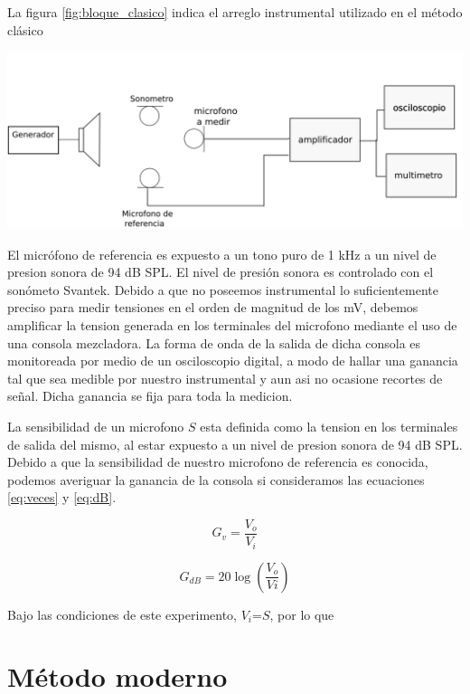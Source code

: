 \documentclass[]{article}
\makeatletter
\newenvironment{figurehere}   %
  {\def\@captype{figure}}   %
  {\par\medskip}
  {}              %
\makeatother
\begin{document}
\begin{multicols}{2}
La figura \ref{fig:bloque_clasico} indica el arreglo instrumental utilizado en el
método clásico

\begin{figurehere}
 \centering
 \includegraphics[width=\linewidth]{blockdiag}
 \label{fig:bloque_clasico}
\end{figurehere}

El micrófono de referencia es expuesto a un tono puro de 1 kHz a un nivel de
presion sonora de 94 dB SPL. El nivel de presión sonora es controlado con el
sonómeto Svantek. Debido a que no poseemos instrumental lo suficientemente
preciso para medir tensiones en el orden de magnitud de los mV, debemos amplificar
la tension generada en los terminales del microfono mediante el uso de una
consola mezcladora. La forma de onda de la salida de dicha consola es monitoreada
por medio de un osciloscopio digital, a modo de hallar una ganancia tal que sea
medible por nuestro instrumental y aun asi no ocasione recortes de señal. Dicha
ganancia se fija para toda la medicion.

La sensibilidad de un microfono $S$ esta definida como la tension en los terminales
de salida del mismo, al estar expuesto a un nivel de presion sonora de 94 dB SPL.
Debido a que la sensibilidad de nuestro microfono de referencia es conocida,
podemos averiguar la ganancia de la consola si consideramos las ecuaciones
\ref{eq:veces} y \ref{eq:dB}.

\begin{equation}
  G_v=\frac{V_o}{V_i}
  \label{eq:veces}
\end{equation}

\begin{equation}
  G_{dB}= 20 \log \left(\frac{V_o}{Vi}\right)
  \label{eq:dB}
\end{equation}

Bajo las condiciones de este experimento, $V_i$=$S$, por lo que

\section{Método moderno}


\end{multicols}
\end{document}

